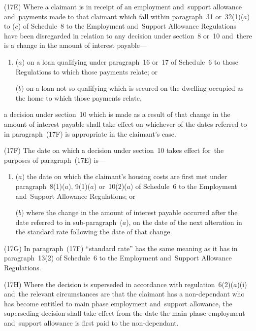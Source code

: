 \documentclass[12pt,a4paper]{article}
\begin{document}
(17E) Where a claimant is in receipt of an employment and~support allowance and~payments made to that claimant which fall within paragraph~31 or~32(1)($a$)  to ($c$)  of Schedule~8 to the Employment and~Support Allowance Regulations have been disregarded in relation to any decision under section~8 or~10 and~there is a change in the amount of interest payable—
\begin{enumerate}\item[]
($a$) on a loan qualifying under paragraph~16 or~17 of Schedule~6 to those Regulations to which those payments relate; or

($b$) on a loan not so qualifying which is secured on the dwelling occupied as the home to which those payments relate,
\end{enumerate}
a decision under section~10 which is made as a result of that change in the amount of interest payable shall take effect on whichever of the dates referred to in paragraph~(17F) is appropriate in the claimant’s case.

(17F) The date on which a decision under section~10 takes effect for~the purposes of paragraph~(17E) is—
\begin{enumerate}\item[]
($a$) the date on which the claimant’s housing costs are first met under paragraph~8(1)($a$), 9(1)($a$)  or~10(2)($a$)  of Schedule~6 to the Employment and~Support Allowance Regulations; or

($b$) where the change in the amount of interest payable occurred after the date referred to in sub-paragraph~($a$), on the date of the next alteration in the standard rate following the date of that change.
\end{enumerate}

(17G) In paragraph~(17F) “standard rate” has the same meaning as it has in paragraph~13(2) of Schedule~6 to the Employment and~Support Allowance Regulations.

(17H) Where the decision is superseded in accordance with regulation~6(2)($a$)(i)  and~the relevant circumstances are that the claimant has a non-dependant who has become entitled to main phase employment and~support allowance, the superseding decision shall take effect from the date the main phase employment and~support allowance is first paid to the non-dependant.
\end{document}
